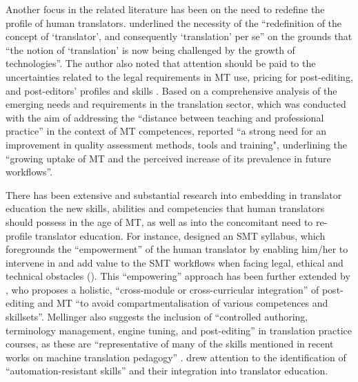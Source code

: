 \documentclass[output=paper,colorlinks,citecolor=brown]{langscibook}
\begin{document}
Another focus in the related literature has been on the need to redefine the profile of human translators. \citet[68--69]{sakamoto_why_2019} underlined the necessity of the “redefinition of the concept of ‘translator’, and {consequently} ‘translation’ per se” on the grounds that “the notion of ‘translation’ is now being challenged by the growth of technologies”. The author also noted that attention should be paid to the uncertainties related to the legal requirements in MT use, pricing for post-editing, and post-editors’ profiles and skills \citep[63--66]{sakamoto_why_2019}. Based on a comprehensive analysis of the emerging needs and requirements in the translation sector, which was conducted with the aim of addressing the “distance between teaching and professional practice” in the context of MT competences, \citet[333--334]{gaspari2015} reported “a strong need for an improvement in quality assessment methods, tools and training", underlining the “growing uptake of MT and the perceived increase of its prevalence in future workflows”.

There has been extensive and substantial research into embedding in translator education the new skills, abilities and competencies that human translators should possess in the age of MT, as well as into the concomitant need to re-profile translator education. For instance, \citet[296--297]{doherty2014} designed an SMT syllabus, which foregrounds the “empowerment” of the human translator by enabling him/her to intervene in and add value to the SMT workflows when facing legal, ethical and technical obstacles (\cite[288]{Kenny04052014}). This “empowering” approach has been further extended by \citet[284]{mellinger_translators_2017}, who proposes a holistic, “cross-module or cross-curricular integration” of post-editing and MT “to avoid compartmentalisation of various competences and skillsets”. Mellinger also suggests the inclusion of “controlled authoring, terminology management, engine tuning, and post-editing” in translation practice courses, as these are “representative of many of the skills mentioned in recent works on machine translation pedagogy” \citep[284]{mellinger_translators_2017}. \citet{pym2019} drew attention to the identification of “automation-resistant skills” and their integration into translator education.
\end{document}
